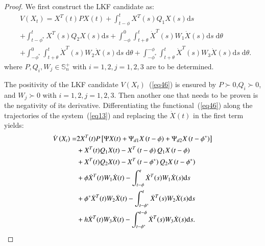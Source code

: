 \documentclass[journal]{IEEEtran}
\begin{document}
\begin{proof}
  We first construct the LKF candidate as:
  \begin{equation}
    \begin{aligned}
      &V\left( {{X_t}} \right) =  {X^{T}}(t)PX(t) + \int_{t - \phi }^t {{X^{T}}} (s){Q_1}X(s){\text{d}}s \\
      &+ \int_{t - {\phi ^*}}^t {{X^{T}}} (s){Q_2}X(s){\text{d}}s  + \int_{ - \phi }^0 {\int_{t + \theta }^t {{{\dot X}^{T}}} } (s){W_1}\dot X(s){\text{d}}s\;{\text{d}}\theta  \\
      &+ \int_{ - {\phi ^*}}^0 {\int_{t + \theta }^t {{{\dot X}^{T}}} } (s){W_2}\dot X(s){\text{d}}s\;{\text{d}}\theta + \int_{ - {\phi ^*}}^{ - \phi } {\int_{t + \theta }^t {{{\dot X}^{T}}} } (s){W_3}\dot X(s){\text{d}}s\;{\text{d}}\theta. 
    \end{aligned}
    \label{eq46}
  \end{equation}
  where $P,Q_i,W_j\in\mathbb{S}_n^+$ with $i=1,2,j=1,2,3$ are to be determined.

  The positivity of the LKF candidate $V\left(X_t\right)$~(\ref{eq46}) is ensured by $P\succ0$,$Q_i\succ0$, and $W_j\succ0$ with $i=1,2,j=1,2,3$. Then another one that needs to be proven is the negativity of its derivative. Differentiating the functional~(\ref{eq46}) along the trajectories of the system~(\ref{eq13}) and replacing the $\dot{X}(t)$ in the first term yields:
  \begin{equation}
    \begin{aligned}
      \dot V\left( {{X_t}} \right) = & 2{X^{T}}(t)P\left[ {\Psi X(t) + {\Psi _{d1}}X\left( {t - \phi } \right) + {\Psi _{d2}}X\left( {t - {\phi ^*}} \right)} \right] \hfill \\
                                     & + {X^{T}}(t){Q_1}X(t) - {X^{T}}\left( {t - \phi } \right){Q_1}X\left( {t - \phi } \right) \hfill                                      \\
                                     & + {X^{T}}(t){Q_2}X(t) - {X^{T}}\left( {t - {\phi ^*}} \right){Q_2}X\left( {t - {\phi ^*}} \right) \hfill                              \\
                                     & + \phi {{\dot X}^{T}}(t){W_1}\dot X(t) - \int_{t - \phi }^t {{{\dot X}^{T}}} (s){W_1}\dot X(s){\text{d}}s \hfill                      \\
                                     & + {\phi ^*}{{\dot X}^{T}}(t){W_2}\dot X(t) - \int_{t - {\phi ^*}}^t {{{\dot X}^{T}}} (s){W_2}\dot X(s){\text{d}}s \hfill              \\
                                     & + h{{\dot X}^{T}}(t){W_3}\dot X(t) - \int_{t - {\phi ^*}}^{t - \phi } {{{\dot X}^{T}}} (s){W_3}\dot X(s){\text{d}}s. \hfill           \\
    \end{aligned}
    \label{eq47}
  \end{equation}


\end{proof}
\end{document}
